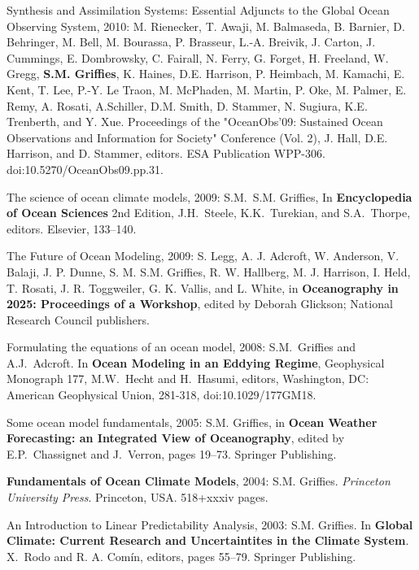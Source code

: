 \begin{etaremune}
\item Synthesis and Assimilation Systems: Essential Adjuncts to the
  Global Ocean Observing System, 2010: M. Rienecker, T. Awaji,
  M. Balmaseda, B. Barnier, D. Behringer, M. Bell, M. Bourassa,
  P. Brasseur, L.-A. Breivik, J. Carton, J. Cummings, E. Dombrowsky,
  C. Fairall, N. Ferry, G. Forget, H. Freeland, W. Gregg, {\bf
    S.M. Grif\/f\/ies}, K. Haines, D.E. Harrison, P. Heimbach,
  M. Kamachi, E. Kent, T. Lee, P.-Y. {Le Traon}, M. McPhaden,
  M. Martin, P. Oke, M. Palmer, E. Remy, A. Rosati, A.Schiller,
  D.M. Smith, D. Stammer, N. Sugiura, K.E. Trenberth, and Y. Xue.
  Proceedings of the "OceanObs’09: Sustained Ocean Observations and
  Information for Society" Conference (Vol. 2), J. Hall,
  D.E. Harrison, and D. Stammer, editors. ESA Publication WPP-306.
  doi:10.5270/OceanObs09.pp.31.

\item The science of ocean climate models, 2009: S.M.\
    S.M. Grif\/f\/ies,  In {\bf Encyclopedia of Ocean Sciences} 2nd Edition,  J.H.\ Steele, K.K.\ Turekian, and S.A.\ Thorpe, editors. Elsevier, 133--140.

\item The Future of Ocean Modeling, 2009: S. Legg, A. J. Adcroft, W.   Anderson, V. Balaji, J. P. Dunne, S. M. S.M. Grif\/f\/ies, R. W. Hallberg, M. J. Harrison, I. Held, T. Rosati, J. R. Toggweiler, G. K. Vallis, and L.  White, in {\bf Oceanography in 2025: Proceedings of a Workshop}, edited by Deborah Glickson; National Research Council publishers.  

\item Formulating the equations of an ocean model, 2008: S.M.\ Grif\/f\/ies and A.J.\ Adcroft. In {\bf Ocean Modeling in an Eddying Regime}, Geophysical Monograph 177, M.W.\ Hecht and H.\ Hasumi, editors, Washington, DC: American Geophysical Union, 281-318, doi:10.1029/177GM18. 

\item Some ocean model fundamentals, 2005: S.M. Grif\/f\/ies, in {\bf Ocean Weather Forecasting: an Integrated View of Oceanography}, edited
by E.P.\ Chassignet and J.\ Verron, pages 19--73.  Springer Publishing.

\item {\bf Fundamentals of Ocean Climate Models}, 2004: S.M. Grif\/f\/ies. {\em Princeton University Press}. Princeton, USA.  518+xxxiv pages.

\item An Introduction to Linear Predictability Analysis, 2003: S.M. Grif\/f\/ies.  In {\bf Global Climate: Current Research and Uncertaintites in the Climate System}. X.\ Rodo and R. A. Com\'in, editors, pages 55--79.  Springer Publishing.


\end{etaremune}
